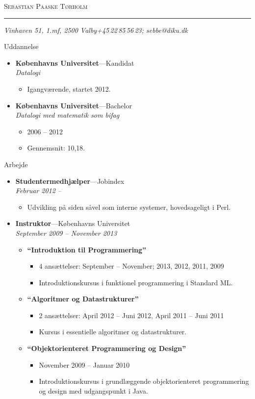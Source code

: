 \documentclass[11pt,oneside,a4paper]{article}
\makeatletter
\newcommand{\name}{Sebastian Paaske Tørholm}
\newcommand{\addr}{Vinhaven 51, 1.mf, 2500 Valby}
\newcommand{\phone}{+45\,22\,85\,56\,23}
\newcommand{\email}{sebbe@diku.dk}
\newcommand{\bigname}[1]{
    \begin{center}\fontfamily{phv}\selectfont\Huge\scshape#1\end{center}
}
\newenvironment{ressection}[1]{
    \vspace{4pt}
    {\fontfamily{phv}\selectfont\Large#1}
    \begin{itemize}
    \vspace{3pt}
}{
    \end{itemize}
}
\newcommand{\resitem}[1]{
    \vspace{-4pt}
    \item \begin{flushleft} #1 \end{flushleft}
}
\newcommand{\ressubitem}[1]{
    \vspace{-1pt}
    \item \begin{flushleft} #1 \end{flushleft}
}
\newcommand{\resbigitem}[3]{
    \vspace{-5pt}
    \item
    \textbf{#1}---#2 \\
    \textit{#3}
}
\newenvironment{ressubsec}[3]{
    \resbigitem{#1}{#2}{#3}
    \vspace{-2pt}
    \begin{itemize}
}{
    \end{itemize}
}
\newenvironment{reslist}[1]{
    \resitem{\textbf{#1}}
    \vspace{-2pt}
    \begin{itemize}
}{
    \end{itemize}
}
\makeatother
\begin{document}
 \selectfont

\bigname{\name}

\vspace{-8pt} \rule{\textwidth}{1pt}

\vspace{-1pt} {\small\itshape \addr \hfill \phone; \email}

\vspace{8 pt}




\begin{ressection}{Uddannelse}
    \begin{ressubsec}{Københavns Universitet}{Kandidat}{Datalogi}
        \ressubitem{Igangværende, startet 2012.}
    \end{ressubsec}

    \begin{ressubsec}{Københavns Universitet}{Bachelor}{Datalogi med matematik som bifag}
        \ressubitem{2006 -- 2012}
        \ressubitem{Gennemsnit: 10,18.}
    \end{ressubsec}

\end{ressection}


\begin{ressection}{Arbejde}
    \begin{ressubsec}{Studentermedhjælper}{Jobindex}{Februar 2012 -- }
        \ressubitem{Udvikling på siden såvel som interne systemer, hovedsageligt i Perl.}
    \end{ressubsec}

    \begin{ressubsec}{Instruktor}{Københavns Universitet}{September 2009 -- November 2013}
        \begin{reslist}{``Introduktion til Programmering''}
            \ressubitem{4 ansættelser: September -- November; 2013, 2012, 2011, 2009}
            \ressubitem{Introduktionskursus i funktionel programmering i Standard ML.}
        \end{reslist}
        \begin{reslist}{``Algoritmer og Datastrukturer''}
            \ressubitem{2 ansættelser: April 2012 -- Juni 2012, April 2011 -- Juni 2011}
            \ressubitem{Kursus i essentielle algoritmer og datastrukturer.}
        \end{reslist}
        \begin{reslist}{``Objektorienteret Programmering og Design''}
            \ressubitem{November 2009 -- Januar 2010}
            \ressubitem{Introduktionskursus i grundlæggende objektorienteret programmering og design med udgangspunkt i Java.}
        \end{reslist}
    \end{ressubsec}

\end{ressection}
\end{document}
